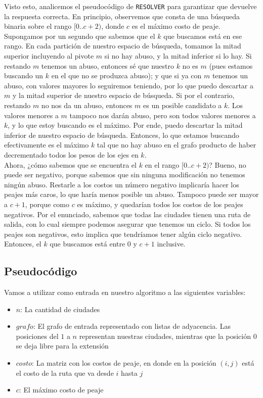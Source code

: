 Visto esto, analicemos el pseudocódigo de \texttt{RESOLVER} para garantizar que devuelve la respuesta correcta. En principio, observemos que consta de una búsqueda binaria sobre el rango $[0..c+2)$, donde $c$ es el máximo costo de peaje. Supongamos por un segundo que sabemos que el $k$ que buscamos está en ese rango. En cada partición de nuestro espacio de búsqueda, tomamos la mitad superior incluyendo al pivote $m$ si no hay abuso, y la mitad inferior si lo hay. Si restando $m$ tenemos un abuso, entonces sé que nuestro $k$ no es $m$ (pues estamos buscando un $k$ en el que no se produzca abuso); y que si ya con $m$ tenemos un abuso, con valores mayores lo seguiremos teniendo, por lo que puedo descartar a $m$ y la mitad superior de nuestro espacio de búsqueda. Si por el contrario, restando $m$ no nos da un abuso, entonces $m$ es un posible candidato a $k$. Los valores menores a $m$ tampoco nos darán abuso, pero son todos valores menores a $k$, y lo que estoy buscando es el máximo. Por ende, puedo descartar la mitad inferior de nuestro espacio de búsqueda. Entonces, lo que estamos buscando efectivamente es el máximo $k$ tal que no hay abuso en el grafo producto de haber decrementado todos los pesos de los ejes en $k$. \\

Ahora, ¿cómo sabemos que se encuentra el $k$ en el rango $[0..c+2)$? Bueno, no puede ser negativo, porque sabemos que sin ninguna modificación no tenemos ningún abuso. Restarle a los costos un número negativo implicaría hacer los peajes más caros, lo que haría menos posible un abuso. Tampoco puede ser mayor a $c+1$, porque como $c$ es máximo, y quedarían todos los costos de los peajes negativos. Por el enunciado, sabemos que todas las ciudades tienen una ruta de salida, con lo cual siempre podemos asegurar que tenemos un ciclo. Si todos los peajes son negativos, esto implica que tendríamos tener algún ciclo negativo. Entonces, el $k$ que buscamos está entre $0$ y $c+1$ inclusive.


\newpage
\subsection{Pseudocódigo}

Vamos a utilizar como entrada en nuestro algoritmo a las siguientes variables:
\begin{itemize}
	\item $n$: La cantidad de ciudades
	\item $grafo$: El grafo de entrada representado con listas de adyacencia. Las posiciones del $1$ a $n$ representan nuestras ciudades, mientras que la posición $0$ se deja libre para la extensión
	\item $costo$: La matriz con los costos de peaje, en donde en la posición $(i,j)$ está el costo de la ruta que va desde $i$ hasta $j$
	\item $c$: El máximo costo de peaje
\end{itemize}

